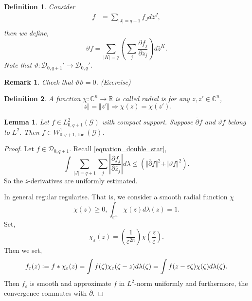 \documentclass{article}
\newtheorem{definition}{Definition}[section]
\newtheorem{lemma}{Lemma}[section]
\newtheorem{remark}{Remark}[section]
\DeclareMathOperator{\loc}{loc}
\newcommand{\defeq}{\vcentcolon=}
\newcommand{\norm}[1]{\Vert #1 \Vert}
\newcommand{\R}[0]{\mathbb{R}}
\newcommand{\C}[0]{\mathbb{C}}
\newcommand{\G}[0]{\mathcal{G}}
\newcommand{\pd}[2]{{\frac {\partial#1} {\partial#2}}}
\begin{document}
\begin{definition}
  Consider
  \begin{align*}
    f & = \sum_{\vert J\vert = q+1}f_Jd\overline{z}^J,\\
  \end{align*}
  then we define,
  \begin{equation*}
  \vartheta f = \sum_{\vert K\vert = q}\left(\sum_j\pd{f_j}{z_j}\right)d\overline{z}^K.
  \end{equation*}
  Note that $\vartheta:\mathcal{D}_{0,q+1}'\to\mathcal{D}_{0,q}'$.
\end{definition}
\begin{remark}
  Check that $\vartheta\vartheta=0$. (Exercise)
\end{remark}
\begin{definition}
  A function $\chi:\C^n\to\R$ is called radial is for any $z,z'\in\C^n$, 
  \begin{equation*}
    \norm{z}=\norm{z'}\Rightarrow \chi(z) = \chi(z').
  \end{equation*}
\end{definition}
\begin{lemma}
  \label{lemma_regularity_1}
  Let $f\in L^2_{0,q+1}(\G)$ with compact support. Suppose $\overline{\partial}f$ and $\vartheta f$ belong to $L^2$. Then $f\in W_{0,q+1,\loc}^1(\G)$.
\end{lemma}
\begin{proof}
  Let $f\in\mathcal{D}_{0,q+1}$. Recall \eqref{equation_double_star}, 
  \begin{equation*}
    \int\sum_{\vert J\vert=q+1}\sum_j \left\vert\pd{f_j}{\overline{z}_j}\right\vert d\lambda\leq(\norm{\overline{\partial}f}^2+\norm{\vartheta f}^2).
  \end{equation*}
  So the $\overline{z}$-derivatives are uniformly estimated. 
  \par In general regular regularise. That is, we consider a smooth radial function $\chi$ 
  \begin{equation*}
    \chi(z)\geq0,\int_{\C^n}\chi(z)d\lambda(z)=1.
  \end{equation*}
  Set,
  \begin{equation*}
    \chi_{\varepsilon}(z) = \left({\frac 1 {\varepsilon^{2n}}}\right)\chi\left({\frac z \varepsilon}\right).
  \end{equation*}
  Then we set,
  \begin{equation*}
    f_\varepsilon(z) \defeq f\ast\chi_\varepsilon(z) = \int f(\zeta)\chi_\varepsilon(\zeta-z)d\lambda(\zeta) = \int f(z-\varepsilon\zeta)\chi(\zeta)d\lambda(\zeta).
  \end{equation*}
  Then $f_\varepsilon$ is smooth and approximate $f$ in $L^2$-norm uniformly and furthermore, the convergence commutes with $\overline{\partial}$. 
\end{proof}
\end{document}
